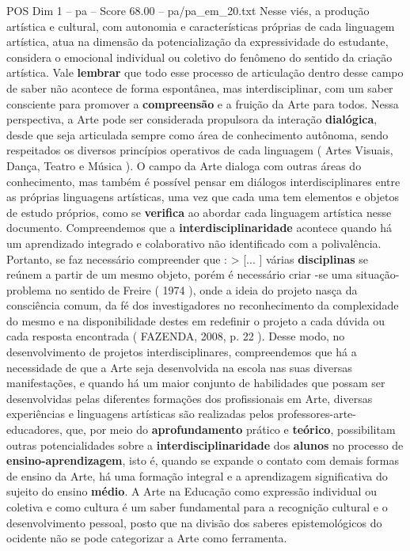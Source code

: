 \begin{textsample}{POS Dim 1 – pa – Score 68.00 – pa/pa\_em\_20.txt}
Nesse viés, a produção artística e cultural, com autonomia e características próprias de cada linguagem artística, atua na dimensão da potencialização da expressividade do estudante, considera o emocional individual ou coletivo do fenômeno do sentido da criação artística.
Vale \textbf{lembrar} que todo esse processo de articulação dentro desse campo de saber não acontece de forma espontânea, mas interdisciplinar, com um saber consciente para promover a \textbf{compreensão} e a fruição da Arte para todos.
Nessa perspectiva, a Arte pode ser considerada propulsora da interação \textbf{dialógica}, desde que seja articulada sempre como área de conhecimento autônoma, sendo respeitados os diversos princípios operativos de cada linguagem ( Artes Visuais, Dança, Teatro e Música ).
O campo da Arte dialoga com outras áreas do conhecimento, mas também é possível pensar em diálogos interdisciplinares entre as próprias linguagens artísticas, uma vez que cada uma tem elementos e objetos de estudo próprios, como se \textbf{verifica} ao abordar cada linguagem artística nesse documento.
Compreendemos que a \textbf{interdisciplinaridade} acontece quando há um aprendizado integrado e colaborativo não identificado com a polivalência.
Portanto, se faz necessário compreender que : > [... ] várias \textbf{disciplinas} se reúnem a partir de um mesmo objeto, porém é necessário criar -se uma situação-problema no sentido de Freire ( 1974 ), onde a ideia do projeto nasça da consciência comum, da fé dos investigadores no reconhecimento da complexidade do mesmo e na disponibilidade destes em redefinir o projeto a cada dúvida ou cada resposta encontrada ( FAZENDA, 2008, p. 22 ).
Desse modo, no desenvolvimento de projetos interdisciplinares, compreendemos que há a necessidade de que a Arte seja desenvolvida na escola nas suas diversas manifestações, e quando há um maior conjunto de habilidades que possam ser desenvolvidas pelas diferentes formações dos profissionais em Arte, diversas experiências e linguagens artísticas são realizadas pelos professores-arte-educadores, que, por meio do \textbf{aprofundamento} prático e \textbf{teórico}, possibilitam outras potencialidades sobre a \textbf{interdisciplinaridade} dos \textbf{alunos} no processo de \textbf{ensino-aprendizagem}, isto é, quando se expande o contato com demais formas de ensino da Arte, há uma formação integral e a aprendizagem significativa do sujeito do ensino \textbf{médio}.
A Arte na Educação como expressão individual ou coletiva e como cultura é um saber fundamental para a recognição cultural e o desenvolvimento pessoal, posto que na divisão dos saberes epistemológicos do ocidente não se pode categorizar a Arte como ferramenta.

\end{textsample}
